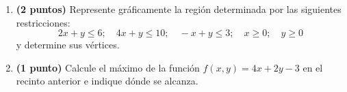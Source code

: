 
\begin{enumerate}[label=\alph*)]
\item \textbf{(2 puntos)} Represente gráficamente la región determinada por las siguientes restricciones:
\[
2x+y\leq6;\quad4x+y\leq10;\quad-x+y\leq3;\quad x\geq0;\quad y\geq0
\]
y determine sus vértices.
\item \textbf{(1 punto)} Calcule el máximo de la función $f(x,y)=4x+2y-3$ en el recinto anterior e indique dónde se alcanza.
\end{enumerate}
